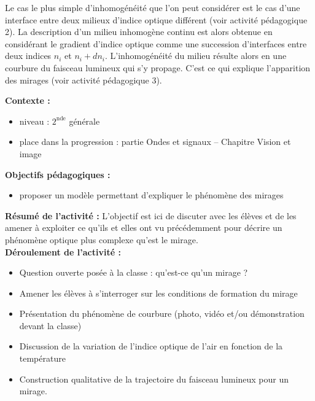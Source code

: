 \documentclass[a4paper,11pt]{article} %
\newenvironment{encart}[1]{%
	\begin{tcolorbox}
		[
		breakable, enhanced jigsaw, %
		arc = 1mm, %
		title = \textbf{#1}, %
		coltitle = white, %
		colbacktitle = blue, %
		colback = white, %
		colframe = blue %
		]
}{		
	\end{tcolorbox}
}
\begin{document}
\begin{encart}{Activité pédagogique 2 : réfraction à une interface -- Loi de Snell-Descartes}
	\end{encart}

	Le cas le plus simple d'inhomogénéité que l'on peut considérer est le cas d'une interface entre deux milieux d'indice optique différent (voir activité pédagogique 2). La description d'un milieu inhomogène continu est alors obtenue en considérant le gradient d'indice optique comme une succession d'interfaces entre deux indices $ n_i $ et $ n_i + dn_i $. L'inhomogénéité du milieu résulte alors en une courbure du faisceau lumineux qui s'y propage. C'est ce qui explique l'apparition des mirages (voir activité pédagogique 3).\\
	
	\begin{encart}{Activité pédagogique 3 : description qualitative d'un mirage}
		\textbf{Contexte :}
		\begin{itemize}
			\item niveau : $ 2^\text{nde} $ générale
			\item place dans la progression : partie Ondes et signaux -- Chapitre Vision et image  
		\end{itemize}
		\vspace{0.5cm}
		
		\textbf{Objectifs pédagogiques :}
		\begin{itemize}
			\item proposer un modèle permettant d'expliquer le phénomène des mirages
		\end{itemize}
		\vspace{0.5cm}
		
		\textbf{Résumé de l'activité :}
		L'objectif est ici de discuter avec les élèves et de les amener à exploiter ce qu'ils et elles ont vu précédemment pour décrire un phénomène optique plus complexe qu'est le mirage.\\
		
		\textbf{Déroulement de l'activité :}
		\begin{itemize}
			\item Question ouverte posée à la classe : \og qu'est-ce qu'un mirage ?\fg{}
			\item Amener les élèves à s'interroger sur les conditions de formation du mirage
			\item Présentation du phénomène de courbure (photo, vidéo et/ou démonstration devant la classe)
			\item Discussion de la variation de l'indice optique de l'air en fonction de la température
			\item Construction qualitative de la trajectoire du faisceau lumineux pour un mirage.
		\end{itemize}
		
	\end{encart}
	
\end{document}
